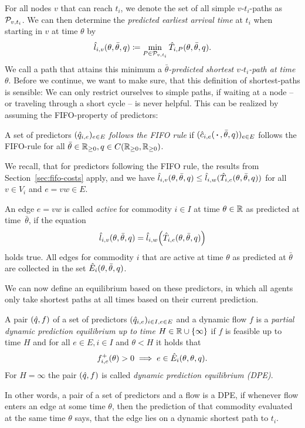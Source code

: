 For all nodes $v$ that can reach $t_i$, we denote the set of all simple $v$-$t_i$-paths as $\mathcal{P}_{v,t_i}$.
We can then determine the \emph{predicted earliest arrival time} at $t_i$ when starting in $v$ at time $\theta$ by
\[
    \hat l_{i,v}(\theta, \bar\theta, q) \coloneqq \min_{P \in \mathcal{P}_{v,t_i}} \hat T_{i, P}(\theta,\bar\theta, q).
\]
We call a path that attains this minimum a \emph{$\bar\theta$-predicted shortest $v$-$t_i$-path at time $\theta$}.
Before we continue, we want to make sure, that this definition of shortest-paths is sensible:
We can only restrict ourselves to simple paths, if waiting at a node -- or traveling through a short cycle -- is never helpful.
This can be realized by assuming the FIFO-property of predictors:
\begin{definition}
    A set of predictors $(\hat q_{i,e})_{e\in E}$ \emph{follows the FIFO rule} if $(\hat c_{i,e}(\,\boldsymbol{\cdot}\,, \bar\theta, q))_{e\in E}$ follows the FIFO-rule for all $\bar\theta\in\mathbb{R}_{\geq0}, q\in{C}{\left({\mathbb{R}_{\geq0}},{\mathbb{R}_{\geq0}}\right)}$.
\end{definition}

We recall, that for predictors following the FIFO rule, the results from Section~\ref{sec:fifo-costs} apply, and we have $\hat l_{i,v}(\theta, \bar\theta, q) \leq \hat l_{i,w}{(
    \hat T_{i, e}(\theta, \bar\theta, q)
)}$
for all $v\in V_i$ and $e=vw\in E$.

\begin{definition}
An edge $e=vw$ is called \emph{active} for commodity $i\in I$ at time $\theta\in\mathbb{R}$ as predicted at time~$\bar\theta$, if the equation \[
    \hat l_{i,v}(\theta, \bar\theta, q) = \hat l_{i,w}{\left(
        \hat T_{i, e}(\theta, \bar\theta, q)
    \right)}
\]
holds true.
All edges for commodity $i$ that are active at time $\theta$ as predicted at $\bar\theta$ are collected in the set $\hat E_i(\theta, \bar\theta, q)$. 
\end{definition}

We can now define an equilibrium based on these predictors, in which all agents only take shortest paths at all times based on their current prediction.
\begin{definition}
    A pair $(\hat q, f)$ of a set of predictors $(\hat q_{i,e})_{i\in I, e\in E}$ and a dynamic flow $f$ is a \emph{partial dynamic prediction equilibrium up to time $H\in\mathbb{R}\cup\{\infty\}$} if $f$ is feasible up to time $H$ and for all $e\in E, i\in I$ and $\theta < H$ it holds that
    \[
        {f}^+_{i,e}(\theta) > 0 \implies e \in \hat E_i(\theta, \theta, q).
    \]
    For $H = \infty$ the pair $(\hat q, f)$ is called \emph{dynamic prediction equilibrium (DPE)}. 
\end{definition}

In other words, a pair of a set of predictors and a flow is a DPE, if whenever flow enters an edge at some time $\theta$, then the prediction of that commodity evaluated at the same time $\theta$ says, that the edge lies on a dynamic shortest path to $t_i$.

